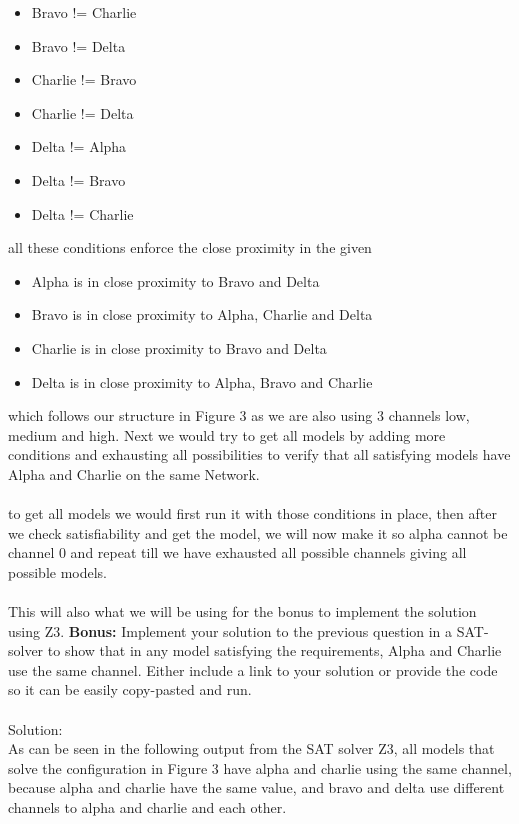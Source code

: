 \documentclass{article}
\newcommand*\moveToRight[1]{\hspace*{0em plus 1fill}\makebox{(#1)}}
\begin{document}
\begin{enumerate}[(a)]
\begin{itemize}
            \item Bravo != Charlie
            \item Bravo != Delta
            \item Charlie != Bravo
            \item Charlie != Delta
            \item Delta != Alpha
            \item Delta != Bravo
            \item Delta != Charlie
        \end{itemize}
        all these conditions enforce the close proximity in the given
        \begin{itemize}
            \item Alpha is in close proximity to Bravo and Delta
            \item Bravo is in close proximity to Alpha, Charlie and Delta
            \item Charlie is in close proximity to Bravo and Delta
            \item Delta is in close proximity to Alpha, Bravo and Charlie
        \end{itemize}
        which follows our structure in Figure 3 as we are also using 3 channels low, medium and high. 
        Next we would try to get all models by adding more conditions and exhausting all possibilities to verify that all satisfying models have Alpha and Charlie on the same Network.\\\\ to get all models we would first run it with those conditions in place, then after we check satisfiability and get the model, we will now make it so alpha cannot be channel 0 and repeat till we have exhausted all possible channels giving all possible models. \\\\ This will also what we will be using for the bonus to implement the solution using Z3.
        \newpage
        \textbf{Bonus:} Implement your solution to the previous question in a SAT-solver to show that in any model satisfying the requirements, Alpha and Charlie use the same channel. Either include a link to your solution or provide the code so it can be easily copy-pasted and run. \moveToRight{10* marks}\\\\
        Solution:\\
        
        As can be seen in the following output from the SAT solver Z3, all models that solve the configuration in Figure 3 have alpha and charlie using the same channel, because alpha and charlie have the same value, and bravo and delta use different channels to alpha and charlie and each other.
\end{enumerate}
\end{document}
